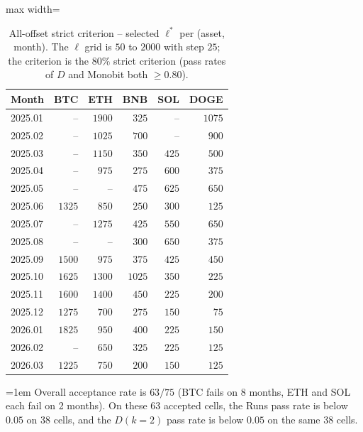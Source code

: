 \documentclass[11pt,titlepage,openany,oneside]{book}  %
\newcommand{\floatnote}[1]{%
  \par\smallskip\noindent%
  \begin{minipage}{\linewidth}%
    \footnotesize\emergencystretch=1em #1%
  \end{minipage}\par%
}
\begin{document}
\begin{table}[!htbp]
  \caption[All-offset strict criterion -- selected $\ell^*$]{All-offset strict criterion -- selected $\ell^*$ per (asset, month). The $\ell$ grid is $50$ to $2000$ with step $25$; the criterion is the $80\%$ strict criterion (pass rates of $D$ and Monobit both $\geq 0.80$).}
  \label{tab:appendix-a2}
  \begin{center}
    \begin{adjustbox}{max width=\textwidth}
    \begin{tabular}{lrrrrr}
      \toprule
      Month   & BTC    & ETH    & BNB    & SOL    & DOGE   \\
      \midrule
      2025.01 & --     & $1900$ & $325$  & --     & $1075$ \\
      2025.02 & --     & $1025$ & $700$  & --     & $900$  \\
      2025.03 & --     & $1150$ & $350$  & $425$  & $500$  \\
      2025.04 & --     & $975$  & $275$  & $600$  & $375$  \\
      2025.05 & --     & --     & $475$  & $625$  & $650$  \\
      2025.06 & $1325$ & $850$  & $250$  & $300$  & $125$  \\
      2025.07 & --     & $1275$ & $425$  & $550$  & $650$  \\
      2025.08 & --     & --     & $300$  & $650$  & $375$  \\
      2025.09 & $1500$ & $975$  & $375$  & $425$  & $450$  \\
      2025.10 & $1625$ & $1300$ & $1025$ & $350$  & $225$  \\
      2025.11 & $1600$ & $1400$ & $450$  & $225$  & $200$  \\
      2025.12 & $1275$ & $700$  & $275$  & $150$  & $75$   \\
      2026.01 & $1825$ & $950$  & $400$  & $225$  & $150$  \\
      2026.02 & --     & $650$  & $325$  & $225$  & $125$  \\
      2026.03 & $1225$ & $750$  & $200$  & $150$  & $125$  \\
      \bottomrule
    \end{tabular}
    \end{adjustbox}
  \end{center}
  \floatnote{Overall acceptance rate is $63/75$ (BTC fails on 8 months, ETH and SOL each fail on 2 months). On these 63 accepted cells, the Runs pass rate is below $0.05$ on 38 cells, and the $D(k{=}2)$ pass rate is below $0.05$ on the same 38 cells.}
\end{table}
\end{document}
